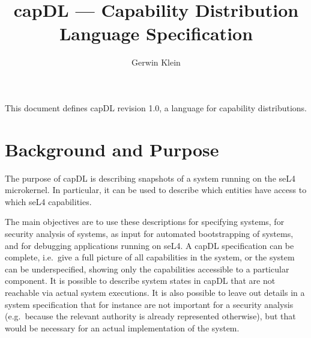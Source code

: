 \documentclass[a4paper,12pt]{article}
\newcommand{\FIXME}[1]{\textbf{\textsl{FIXME: #1}}}
\newcommand{\FIXME}[1]{\relax}
\begin{document}
\title{capDL --- Capability Distribution Language Specification}
\author{Gerwin Klein}
\maketitle

\noindent
This document defines capDL revision 1.0, a language for capability
distributions.

\section{Background and Purpose}
\label{sec:capDL:purpose}

The purpose of capDL is describing snapshots of a system running on the seL4
microkernel. In particular, it can be used to describe which entities 
have access to which seL4 capabilities.

The main objectives are to use these descriptions for specifying systems, for
security analysis of systems, as input for automated bootstrapping of systems,
and for debugging applications running on seL4. A capDL specification can be
complete, i.e.\ give a full picture of all capabilities in the system, or the
system can be underspecified, showing only the capabilities accessible to a
particular component. It is possible to describe system states in capDL that
are not reachable via actual system executions. It is also possible to leave
out details in a system specification that for instance are not important for
a security analysis (e.g.\ because the relevant authority is already
represented otherwise), but that would be necessary for an actual
implementation of the system.


%
%
%
%
%
%
%
%
%
%
%
%
%
%
%
%
%
\end{document}

